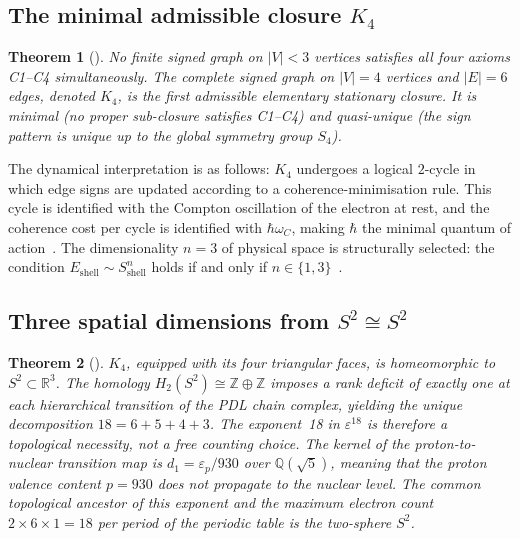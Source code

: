 \documentclass[11pt,a4paper]{article}
\theoremstyle{plain}
\newtheorem{theorem}{Theorem}[section]
\theoremstyle{definition}
\theoremstyle{remark}
\newcommand{\Kfour}{K_4}
\begin{document}
\subsection{The minimal admissible closure \texorpdfstring{$K_4$}{K4}}
\label{subsec:K4}
\begin{theorem}[\cite{D16a}]
\label{thm:K4}
No finite signed graph on $|V|<3$ vertices satisfies all four axioms C1--C4 simultaneously. The complete signed graph on $|V|=4$ vertices and $|E|=6$ edges, denoted $\Kfour$, is the first admissible elementary stationary closure. It is minimal (no proper sub-closure satisfies C1--C4) and quasi-unique (the sign pattern is unique up to the global symmetry group $S_4$).
\end{theorem}

The dynamical interpretation is as follows: $\Kfour$ undergoes a logical $2$-cycle in which edge signs are updated according to a coherence-minimisation rule. This cycle is identified with the Compton oscillation of the electron at rest, and the coherence cost per cycle is identified with $\hbar\omega_C$, making $\hbar$ the minimal quantum of action~\cite{D01,D02}. The dimensionality $n=3$ of physical space is structurally selected: the condition $E_{\mathrm{shell}}\sim S_{\mathrm{shell}}^n$ holds if and only if $n\in\{1,3\}$~\cite{D23}.

\subsection{Three spatial dimensions from \texorpdfstring{$S^2\cong S^2$}{S² ≅ S²}}
\label{subsec:topology}
\begin{theorem}[\cite{D23}]
\label{thm:exponent18}
$K_4$, equipped with its four triangular faces, is homeomorphic to $S^2\subset\mathbb{R}^3$. The homology $H_2(S^2)\cong\mathbb{Z}\oplus\mathbb{Z}$ imposes a rank deficit of exactly one at each hierarchical transition of the PDL chain complex, yielding the unique decomposition $18=6+5+4+3$. The exponent~18 in $\varepsilon^{18}$ is therefore a topological necessity, not a free counting choice. The kernel of the proton-to-nuclear transition map is $d_1=\varepsilon_p/930$ over $\mathbb{Q}(\sqrt{5})$, meaning that the proton valence content $p=930$ does not propagate to the nuclear level. The common topological ancestor of this exponent and the maximum electron count $2\times 6\times 1=18$ per period of the periodic table is the two-sphere $S^2$.
\end{theorem}

\end{document}
